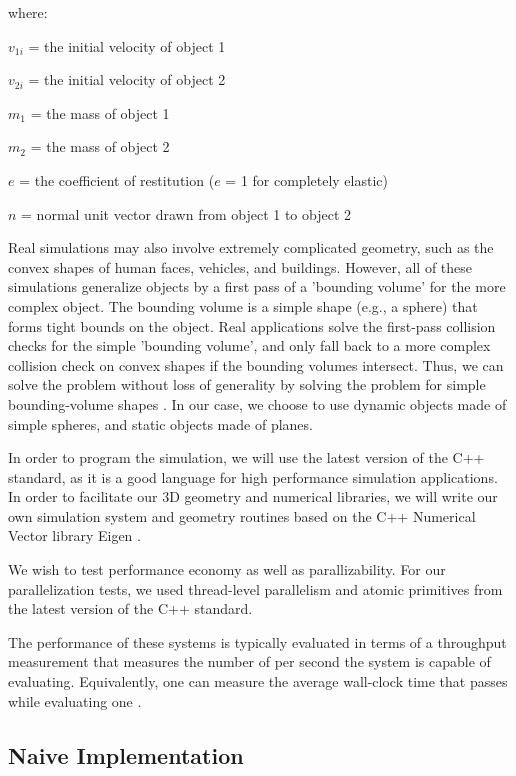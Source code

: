 \documentclass[conference]{IEEEtran}
\begin{document}
where:

$v_{1i}$ = the initial velocity of object 1

$v_{2i}$ = the initial velocity of object 2

$m_1$ = the mass of object 1

$m_2$ = the mass of object 2

$e$ = the coefficient of restitution ($e$ = 1 for completely elastic)

$n$ = normal unit vector drawn from object 1 to object 2


Real simulations may also involve extremely complicated geometry, such as the convex shapes of human faces, vehicles, and buildings.  However, 
all of these simulations generalize objects by a first pass of a 'bounding volume' for the more complex object.  The bounding volume is a simple shape (e.g., a sphere)
that forms tight bounds on the object.  Real applications solve the first-pass collision checks for the simple 'bounding volume', and only fall back to a more complex
collision check on convex shapes if the bounding volumes intersect.  Thus, we can solve the problem without loss of generality by solving the problem
for simple bounding-volume shapes \cite{uberflow,cloth}.  In our case, we choose to use dynamic objects made of simple spheres, and static objects made of planes.

In order to program the simulation, we will use the latest version of the C++ standard, as it is a good language for high performance simulation applications.  In order to facilitate our 
3D geometry and numerical libraries, we will write our own simulation system and geometry routines based on the C++ Numerical Vector library Eigen \cite{eigenweb}.  

We wish to test performance economy as well as parallizability.  For our parallelization tests, we used thread-level parallelism and atomic primitives from the latest version of the C++ standard.

The performance of these systems is typically evaluated in terms of a throughput measurement that measures the number of  per second the system is capable of evaluating.  Equivalently, one can measure the average wall-clock time that passes while evaluating one .

\subsection{Naive Implementation}
\end{document}
